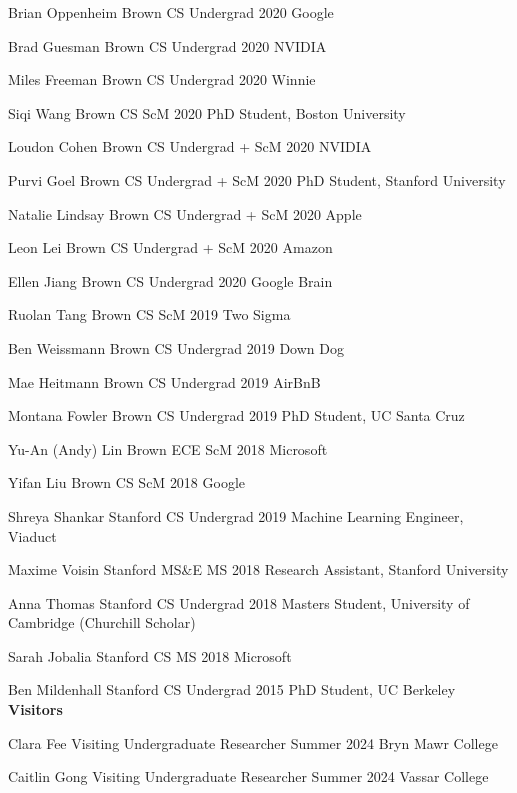 \documentclass[line,margin]{res}
\begin{document}
\begin{resume}
\alumni
{Brian Oppenheim}
{Brown CS Undergrad}
{2020}
{Google}

\alumni
{Brad Guesman}
{Brown CS Undergrad}
{2020}
{NVIDIA}

\alumni
{Miles Freeman}
{Brown CS Undergrad}
{2020}
{Winnie}

\alumni
{Siqi Wang}
{Brown CS ScM}
{2020}
{PhD Student, Boston University}

\alumni
{Loudon Cohen}
{Brown CS Undergrad + ScM}
{2020}
{NVIDIA}

\alumni
{Purvi Goel}
{Brown CS Undergrad + ScM}
{2020}
{PhD Student, Stanford University}

\alumni
{Natalie Lindsay}
{Brown CS Undergrad + ScM}
{2020}
{Apple}

\alumni
{Leon Lei}
{Brown CS Undergrad + ScM}
{2020}
{Amazon}

\alumni
{Ellen Jiang}
{Brown CS Undergrad}
{2020}
{Google Brain}

\alumni
{Ruolan Tang}
{Brown CS ScM}
{2019}
{Two Sigma}

\alumni
{Ben Weissmann}
{Brown CS Undergrad}
{2019}
{Down Dog}

\alumni
{Mae Heitmann}
{Brown CS Undergrad}
{2019}
{AirBnB}

\alumni
{Montana Fowler}
{Brown CS Undergrad}
{2019}
{PhD Student, UC Santa Cruz}

\alumni
{Yu-An (Andy) Lin}
{Brown ECE ScM}
{2018}
{Microsoft}

\alumni
{Yifan Liu}
{Brown CS ScM}
{2018}
{Google}

\alumni
{Shreya Shankar}
{Stanford CS Undergrad}
{2019}
{Machine Learning Engineer, Viaduct}

\alumni
{Maxime Voisin}
{Stanford MS\&E MS}
{2018}
{Research Assistant, Stanford University}

\alumni
{Anna Thomas}
{Stanford CS Undergrad}
{2018}
{Masters Student, University of Cambridge (Churchill Scholar)}

\alumni
{Sarah Jobalia}
{Stanford CS MS}
{2018}
{Microsoft}

\alumni
{Ben Mildenhall}
{Stanford CS Undergrad}
{2015}
{PhD Student, UC Berkeley}
\\


\textbf{Visitors}

\visitor
{Clara Fee}
{Visiting Undergraduate Researcher}
{Summer 2024}
{Bryn Mawr College}

\visitor
{Caitlin Gong}
{Visiting Undergraduate Researcher}
{Summer 2024}
{Vassar College}


\end{resume}
\end{document}
